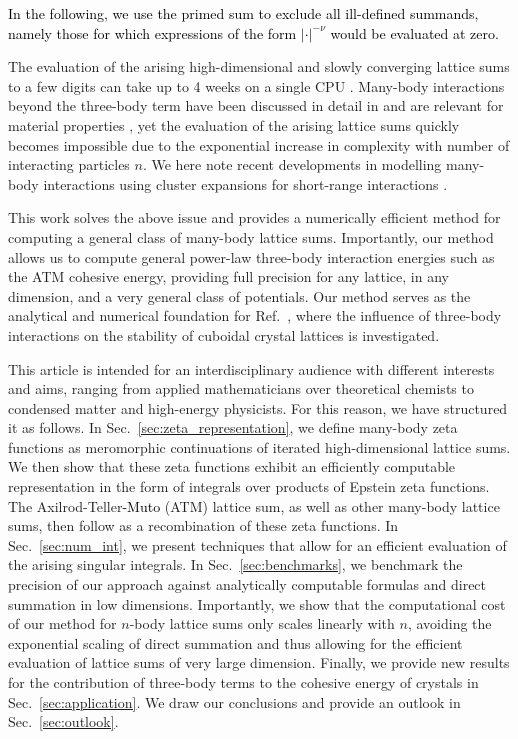 \documentclass[]{amsart}
\numberwithin{mythm}{section}
\newcommand{\new}[1]{{\textcolor{black}{#1}}}
\begin{document}
\new{In the following, we use the primed sum to exclude all ill-defined summands, namely those for which expressions of the form $\vert \bm{\cdot} \vert^{-\nu}$ would be evaluated at zero.}

The evaluation of the arising high-dimensional and slowly converging lattice sums to a few digits can take up to 4 weeks on a single CPU \cite{schwerdtfeger2016towards}. Many-body interactions beyond the three-body term have been discussed in detail in \cite{bade1957drude} and are relevant for material properties \cite{schwerdtfeger2016towards}, yet the evaluation of the arising lattice sums quickly becomes impossible due to the exponential increase in complexity with number of interacting particles $n$.  We here note recent developments in modelling many-body interactions using cluster expansions for short-range interactions  \cite{bochkarev2024graph}.

This work solves the above issue and provides a numerically efficient method for computing a general class of many-body lattice sums. Importantly, our method allows us to compute general power-law three-body interaction energies such as the ATM cohesive energy, providing full precision for any lattice, in any dimension, and a very general class of potentials. Our method serves as the analytical and numerical foundation for Ref.~\cite{roblesnavarro2025exact}, where the influence of three-body interactions on the stability of cuboidal crystal lattices is investigated.





This article is intended for an interdisciplinary audience with different interests and aims, ranging from applied mathematicians over theoretical chemists to condensed matter and high-energy physicists. For this reason, we have structured it as follows. In Sec.~\ref{sec:zeta_representation}, we define many-body zeta functions as meromorphic continuations of iterated high-dimensional lattice sums. We then show that these zeta functions exhibit an efficiently computable representation in the form of integrals over products of Epstein zeta functions. The Axilrod-Teller\new{-Muto} (ATM) lattice sum, as well as other many-body lattice sums, then follow as a recombination of these zeta functions. In Sec.~\ref{sec:num_int}, we present techniques that allow for an efficient evaluation of the arising singular integrals.  In Sec.~\ref{sec:benchmarks}, we benchmark the precision of our approach against analytically computable formulas and direct summation in low dimensions. Importantly, we show that the computational cost of our method for $n$-body lattice sums only scales linearly with $n$, avoiding the exponential scaling of direct summation and thus allowing for the efficient evaluation of lattice sums of very large dimension. Finally, we provide new results for the contribution of three-body terms to the cohesive energy of crystals in Sec.~\ref{sec:application}. We draw our conclusions and provide an outlook in Sec.~\ref{sec:outlook}.
\end{document}
